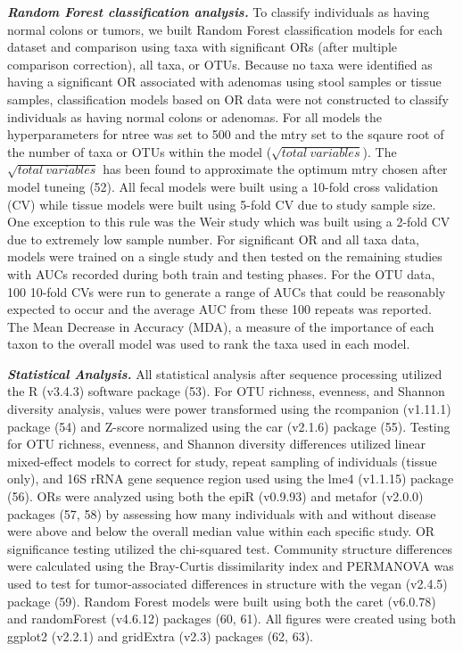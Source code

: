 \documentclass[12pt,]{article}
\begin{document}
\textbf{\emph{Random Forest classification analysis.}} To classify
individuals as having normal colons or tumors, we built Random Forest
classification models for each dataset and comparison using taxa with
significant ORs (after multiple comparison correction), all taxa, or
OTUs. Because no taxa were identified as having a significant OR
associated with adenomas using stool samples or tissue samples,
classification models based on OR data were not constructed to classify
individuals as having normal colons or adenomas. For all models the
hyperparameters for ntree was set to 500 and the mtry set to the sqaure
root of the number of taxa or OTUs within the model
(\(\sqrt{total~variables}\)). The \(\sqrt{total~variables}\) has been
found to approximate the optimum mtry chosen after model tuneing (52).
All fecal models were built using a 10-fold cross validation (CV) while
tissue models were built using 5-fold CV due to study sample size. One
exception to this rule was the Weir study which was built using a 2-fold
CV due to extremely low sample number. For significant OR and all taxa
data, models were trained on a single study and then tested on the
remaining studies with AUCs recorded during both train and testing
phases. For the OTU data, 100 10-fold CVs were run to generate a range
of AUCs that could be reasonably expected to occur and the average AUC
from these 100 repeats was reported. The Mean Decrease in Accuracy
(MDA), a measure of the importance of each taxon to the overall model
was used to rank the taxa used in each model.

\textbf{\emph{Statistical Analysis.}} All statistical analysis after
sequence processing utilized the R (v3.4.3) software package (53). For
OTU richness, evenness, and Shannon diversity analysis, values were
power transformed using the rcompanion (v1.11.1) package (54) and
Z-score normalized using the car (v2.1.6) package (55). Testing for OTU
richness, evenness, and Shannon diversity differences utilized linear
mixed-effect models to correct for study, repeat sampling of individuals
(tissue only), and 16S rRNA gene sequence region used using the lme4
(v1.1.15) package (56). ORs were analyzed using both the epiR (v0.9.93)
and metafor (v2.0.0) packages (57, 58) by assessing how many individuals
with and without disease were above and below the overall median value
within each specific study. OR significance testing utilized the
chi-squared test. Community structure differences were calculated using
the Bray-Curtis dissimilarity index and PERMANOVA was used to test for
tumor-associated differences in structure with the vegan (v2.4.5)
package (59). Random Forest models were built using both the caret
(v6.0.78) and randomForest (v4.6.12) packages (60, 61). All figures were
created using both ggplot2 (v2.2.1) and gridExtra (v2.3) packages (62,
63).
\end{document}
